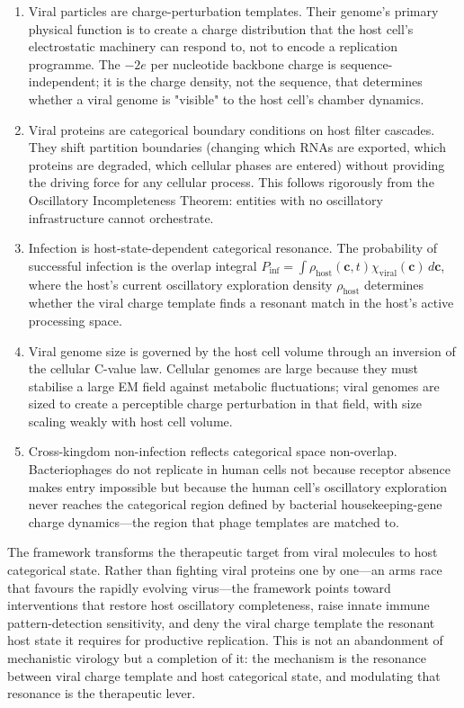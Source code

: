 \documentclass[11pt,twocolumn,a4paper]{article}
\theoremstyle{definition}
\theoremstyle{remark}
\newcommand{\Phost}{\rho_{\mathrm{host}}}
\newcommand{\chiviral}{\chi_{\mathrm{viral}}}
\newcommand{\vv}[1]{\boldsymbol{#1}}
\begin{document}
\begin{enumerate}[(1)]
  \item Viral particles are charge-perturbation templates. Their genome's primary physical function is to create a charge distribution that the host cell's electrostatic machinery can respond to, not to encode a replication programme. The $-2e$ per nucleotide backbone charge is sequence-independent; it is the charge density, not the sequence, that determines whether a viral genome is "visible" to the host cell's chamber dynamics.

  \item Viral proteins are categorical boundary conditions on host filter cascades. They shift partition boundaries (changing which RNAs are exported, which proteins are degraded, which cellular phases are entered) without providing the driving force for any cellular process. This follows rigorously from the Oscillatory Incompleteness Theorem: entities with no oscillatory infrastructure cannot orchestrate.

  \item Infection is host-state-dependent categorical resonance. The probability of successful infection is the overlap integral $P_{\mathrm{inf}} = \int \Phost(\vv{c},t) \chiviral(\vv{c})\,d\vv{c}$, where the host's current oscillatory exploration density $\Phost$ determines whether the viral charge template finds a resonant match in the host's active processing space.

  \item Viral genome size is governed by the host cell volume through an inversion of the cellular C-value law. Cellular genomes are large because they must stabilise a large EM field against metabolic fluctuations; viral genomes are sized to create a perceptible charge perturbation in that field, with size scaling weakly with host cell volume.

  \item Cross-kingdom non-infection reflects categorical space non-overlap. Bacteriophages do not replicate in human cells not because receptor absence makes entry impossible but because the human cell's oscillatory exploration never reaches the categorical region defined by bacterial housekeeping-gene charge dynamics---the region that phage templates are matched to.
\end{enumerate}

The framework transforms the therapeutic target from viral molecules to host categorical state. Rather than fighting viral proteins one by one---an arms race that favours the rapidly evolving virus---the framework points toward interventions that restore host oscillatory completeness, raise innate immune pattern-detection sensitivity, and deny the viral charge template the resonant host state it requires for productive replication. This is not an abandonment of mechanistic virology but a completion of it: the mechanism is the resonance between viral charge template and host categorical state, and modulating that resonance is the therapeutic lever.



\end{document}
